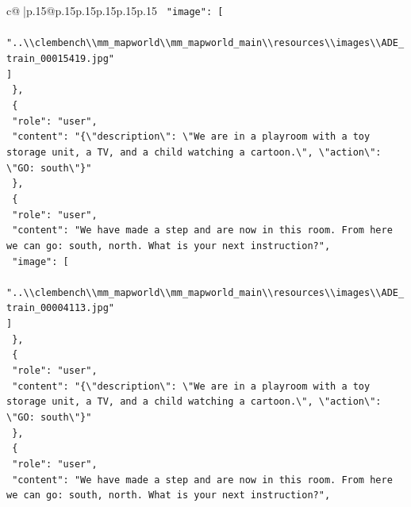 \documentclass{article}
\begin{document}
{\begin{supertabular}{c@{$\;$}|p{.15\linewidth}@{}p{.15\linewidth}p{.15\linewidth}p{.15\linewidth}p{.15\linewidth}p{.15\linewidth}}
{{{\texttt{    "image": {[}} \\
\texttt{      "..\textbackslash{}\textbackslash{}clembench\textbackslash{}\textbackslash{}mm\_mapworld\textbackslash{}\textbackslash{}mm\_mapworld\_main\textbackslash{}\textbackslash{}resources\textbackslash{}\textbackslash{}images\textbackslash{}\textbackslash{}ADE\_train\_00015419.jpg"} \\
\texttt{    {]}} \\
\texttt{  \},} \\
\texttt{  \{} \\
\texttt{    "role": "user",} \\
\texttt{    "content": "\{\textbackslash{}"description\textbackslash{}": \textbackslash{}"We are in a playroom with a toy storage unit, a TV, and a child watching a cartoon.\textbackslash{}", \textbackslash{}"action\textbackslash{}": \textbackslash{}"GO: south\textbackslash{}"\}"} \\
\texttt{  \},} \\
\texttt{  \{} \\
\texttt{    "role": "user",} \\
\texttt{    "content": "We have made a step and are now in this room. From here we can go: south, north. What is your next instruction?",} \\
\texttt{    "image": {[}} \\
\texttt{      "..\textbackslash{}\textbackslash{}clembench\textbackslash{}\textbackslash{}mm\_mapworld\textbackslash{}\textbackslash{}mm\_mapworld\_main\textbackslash{}\textbackslash{}resources\textbackslash{}\textbackslash{}images\textbackslash{}\textbackslash{}ADE\_train\_00004113.jpg"} \\
\texttt{    {]}} \\
\texttt{  \},} \\
\texttt{  \{} \\
\texttt{    "role": "user",} \\
\texttt{    "content": "\{\textbackslash{}"description\textbackslash{}": \textbackslash{}"We are in a playroom with a toy storage unit, a TV, and a child watching a cartoon.\textbackslash{}", \textbackslash{}"action\textbackslash{}": \textbackslash{}"GO: south\textbackslash{}"\}"} \\
\texttt{  \},} \\
\texttt{  \{} \\
\texttt{    "role": "user",} \\
\texttt{    "content": "We have made a step and are now in this room. From here we can go: south, north. What is your next instruction?",} \\
}}}
\end{supertabular}}
\end{document}

